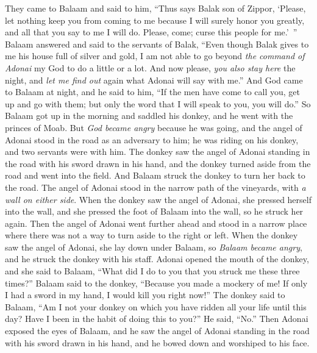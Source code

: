 \begin{biblechapter}
\verse They came to Balaam and said to him, “Thus says Balak son of Zippor, ‘Please, let nothing keep you from coming to me
\verse because I will surely honor you greatly, and all that you say to me I will do. Please, come; curse this people for me.’ ”
\verse Balaam answered and said to the servants of Balak, “Even though Balak gives to me his house full of silver and gold, I am not able to go beyond \textit{the command of Adonai} my God to do a little or a lot.
\verse And now please, \textit{you also stay here} the night, and \textit{let me find out} again what Adonai will say with me.”
\verse And God came to Balaam at night, and he said to him, “If the men have come to call you, get up and go with them; but only the word that I will speak to you, you will do.”
\verse So Balaam got up in the morning and saddled his donkey, and he went with the princes of Moab.
 But \textit{God became angry} because he was going, and the angel of Adonai stood in the road as an adversary to him; he was riding on his donkey, and two servants were with him.
\verse The donkey saw the angel of Adonai standing in the road with his sword drawn in his hand, and the donkey turned aside from the road and went into the field. And Balaam struck the donkey to turn her back to the road.
\verse The angel of Adonai stood in the narrow path of the vineyards, with \textit{a wall on either side}.
\verse When the donkey saw the angel of Adonai, she pressed herself into the wall, and she pressed the foot of Balaam into the wall, so he struck her again.
\verse Then the angel of Adonai went further ahead and stood in a narrow place where there was not a way to turn aside to the right or left.
\verse When the donkey saw the angel of Adonai, she lay down under Balaam, so \textit{Balaam became angry}, and he struck the donkey with his staff.
\verse Adonai opened the mouth of the donkey, and she said to Balaam, “What did I do to you that you struck me these three times?”
\verse Balaam said to the donkey, “Because you made a mockery of me! If only I had a sword in my hand, I would kill you right now!”
\verse The donkey said to Balaam, “Am I not your donkey on which you have ridden all your life until this day? Have I been in the habit of doing this to you?” He said, “No.”
\verse Then Adonai exposed the eyes of Balaam, and he saw the angel of Adonai standing in the road with his sword drawn in his hand, and he bowed down and worshiped to his face.

\end{biblechapter}
